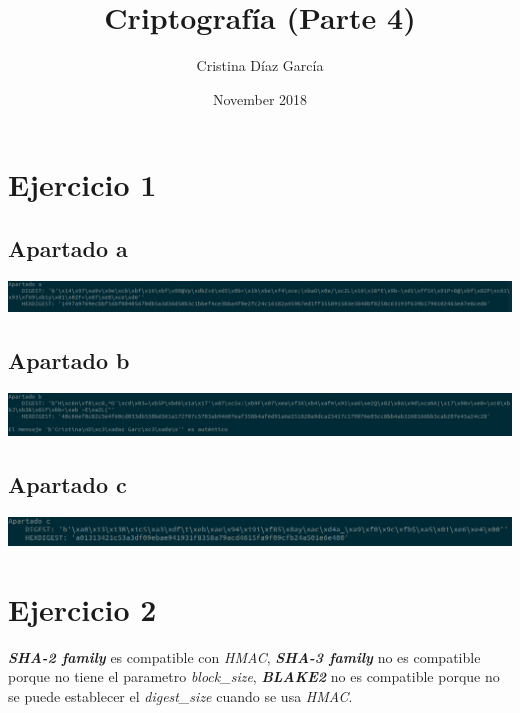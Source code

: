 \documentclass{article}
\title{Criptografía (Parte 4)}
\author{Cristina Díaz García}
\date{November 2018}
\begin{document}

\begin{titlingpage}
\maketitle
\end{titlingpage}

\newpage

\tableofcontents

\newpage

\section{Ejercicio 1}
\subsection{Apartado a}
\includegraphics[scale=0.3]{ApartadoA.png} 

\subsection{Apartado b}
\includegraphics[scale=0.3]{ApartadoB.png}

\subsection{Apartado c}
\includegraphics[scale=0.4]{ApartadoC.png}

\newpage

\section{Ejercicio 2}
\textbf{\textit{SHA-2 family}} es compatible con \textit{HMAC}, 
\textbf{\textit{SHA-3 family}} no es compatible porque no tiene el parametro \textit{block\_size}, 
\textbf{\textit{BLAKE2}} no es compatible porque no se puede establecer el \textit{digest\_size} cuando se usa \textit{HMAC}.
\end{document}
